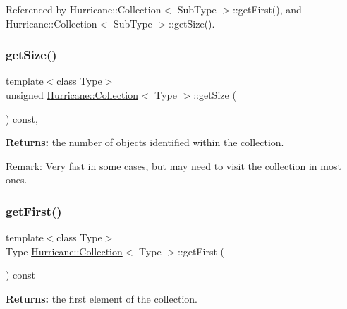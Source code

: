 Referenced by Hurricane\+::\+Collection$<$ Sub\+Type $>$\+::get\+First(), and Hurricane\+::\+Collection$<$ Sub\+Type $>$\+::get\+Size().

\mbox{\label{classHurricane_1_1Collection_a1292aabe88c9aadfdfe21dabddb62c19}} 
\subsubsection{\texorpdfstring{get\+Size()}{getSize()}}
{\footnotesize\ttfamily template$<$class Type$>$ \\
unsigned \mbox{\hyperlink{classHurricane_1_1Collection}{Hurricane\+::\+Collection}}$<$ Type $>$\+::get\+Size (\begin{DoxyParamCaption}{ }\end{DoxyParamCaption}) const\hspace{0.3cm}{\ttfamily [inline]}, {\ttfamily [virtual]}}

{\bfseries Returns\+:} the number of objects identified within the collection.

\begin{DoxyParagraph}{Remark\+: Very fast in some cases, but may need to visit the collection }
in most ones. 
\end{DoxyParagraph}
\mbox{\label{classHurricane_1_1Collection_a846a042646e02a0f77d2ce0f6190288a}} 
\subsubsection{\texorpdfstring{get\+First()}{getFirst()}}
{\footnotesize\ttfamily template$<$class Type$>$ \\
Type \mbox{\hyperlink{classHurricane_1_1Collection}{Hurricane\+::\+Collection}}$<$ Type $>$\+::get\+First (\begin{DoxyParamCaption}{ }\end{DoxyParamCaption}) const\hspace{0.3cm}{\ttfamily [inline]}}

{\bfseries Returns\+:} the first element of the collection.

